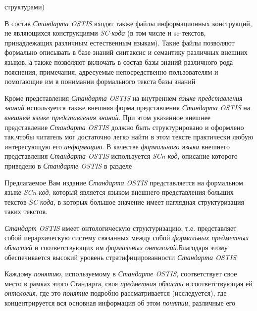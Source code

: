 \begin{SCn}
{\begin{scnvector}
			            структурами)
			\item В состав \textit{Стандарта OSTIS} входят также файлы
			            информационных конструкций, не являющихся конструкциями \textit{SC-кода} (в том
			            числе и sc-текстов, принадлежащих различным естественным языкам). Такие файлы
			            позволяют формально описывать в базе знаний синтаксис и семантику различных
			            внешних языков, а также позволяют включать в состав базы знаний различного рода
			            пояснения, примечания, адресуемые непосредственно пользователям и помогающие им
			            в понимании формального текста базы знаний
			\item Кроме представления \textit{Стандарта OSTIS} на внутреннем
			\textit{языке представления знаний} используется также внешняя форма
			представления \textit{Стандарта OSTIS} на \textit{внешнем языке представления
				знаний}. При этом указанное внешнее представление \textit{Стандарта OSTIS}
			должно быть структурировано и оформлено так,чтобы читатель мог достаточно легко
			 найти в этом тексте практически любую интересующую его
			\textit{информацию}. В качестве \textit{формального языка} внешнего
			представления \textit{Стандарта OSTIS} используется \textit{SCn-код}, описание
			которого приведено в \textit{Стандарте OSTIS} в разделе 
			\item Предлагаемое Вам издание \textit{Стандарта OSTIS}
			            представляется на формальном языке \textit{SCn-код}, который является языком
			            внешнего представления больших текстов \textit{SC-кода}, в которых большое
			            значение имеет наглядная структуризация таких текстов.
			\item \textit{Стандарт OSTIS} имеет онтологическую
			            структуризацию, т.е. представляет собой иерархическую систему связанных между
			            собой \textit{формальных предметных областей} и соответствующих им
			            \textit{формальных онтологий}.Благодаря этому обеспечивается высокий уровень
			            стратифицированности \textit{Стандарта OSTIS}
			\item Каждому \textit{понятию}, используемому в
			            \textit{Стандарте OSTIS}, соответствует свое место в рамках этого Стандарта,
			            своя \textit{предметная область} и соответствующая ей \textit{онтология}, где
			            это \textit{понятие} подробно рассматривается (исследуется), где
			            концентрируется вся основная информация об этом \textit{понятии}, различные его

\end{scnvector}}
\end{SCn}
